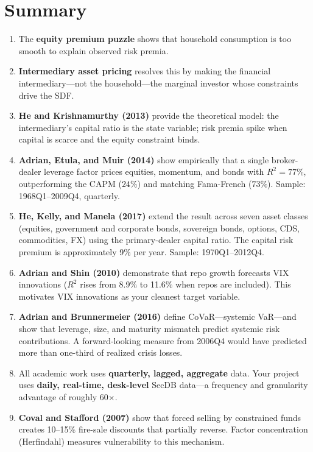 \section{Summary}
\label{sec:ch2-summary}

\begin{enumerate}[nosep]
  \item The \textbf{equity premium puzzle} shows that household consumption is too smooth to explain observed risk premia.
  \item \textbf{Intermediary asset pricing} resolves this by making the financial intermediary---not the household---the marginal investor whose constraints drive the SDF.
  \item \textbf{He and Krishnamurthy (2013)} provide the theoretical model: the intermediary's capital ratio is the state variable; risk premia spike when capital is scarce and the equity constraint binds.
  \item \textbf{Adrian, Etula, and Muir (2014)} show empirically that a single broker-dealer leverage factor prices equities, momentum, and bonds with $R^2 = 77\%$, outperforming the CAPM ($24\%$) and matching Fama-French ($73\%$). Sample: 1968Q1--2009Q4, quarterly.
  \item \textbf{He, Kelly, and Manela (2017)} extend the result across seven asset classes (equities, government and corporate bonds, sovereign bonds, options, CDS, commodities, FX) using the primary-dealer capital ratio. The capital risk premium is approximately 9\% per year. Sample: 1970Q1--2012Q4.
  \item \textbf{Adrian and Shin (2010)} demonstrate that repo growth forecasts VIX innovations ($R^2$ rises from 8.9\% to 11.6\% when repos are included). This motivates VIX innovations as your cleanest target variable.
  \item \textbf{Adrian and Brunnermeier (2016)} define CoVaR---systemic VaR---and show that leverage, size, and maturity mismatch predict systemic risk contributions. A forward-looking measure from 2006Q4 would have predicted more than one-third of realized crisis losses.
  \item All academic work uses \textbf{quarterly, lagged, aggregate} data. Your project uses \textbf{daily, real-time, desk-level} SecDB data---a frequency and granularity advantage of roughly 60$\times$.
  \item \textbf{Coval and Stafford (2007)} show that forced selling by constrained funds creates 10--15\% fire-sale discounts that partially reverse. Factor concentration (Herfindahl) measures vulnerability to this mechanism.

\end{enumerate}
